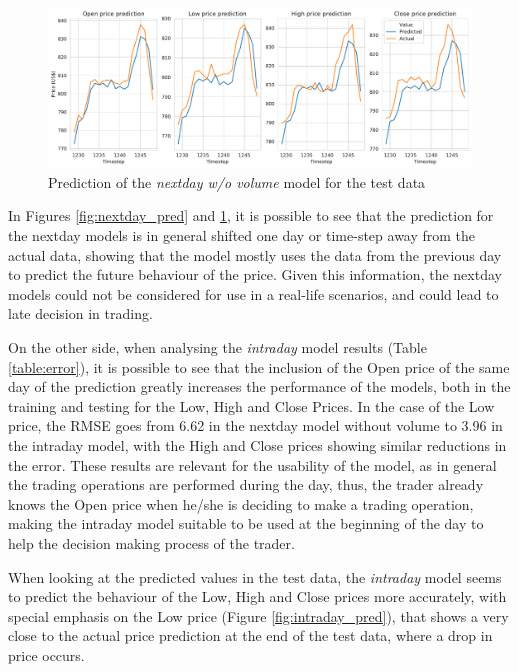 \documentclass[10pt,twocolumn,letterpaper]{article}
\begin{document}
\begin{figure}[h]
	\begin{center}
		\includegraphics[width=1\linewidth]{prediction_nextday_novolume.pdf}
		\caption{Prediction of the \textit{nextday w/o volume} model for the test data}
		\label{fig:nextday_novolume_pred}
	\end{center}
\end{figure}


In Figures \ref{fig:nextday_pred} and \ref{fig:nextday_novolume_pred}, it is possible to see that the prediction for the nextday models is in general shifted one day or time-step away from the actual data, showing that the model mostly uses the data from the previous day to predict the future behaviour of the price. Given this information, the nextday models could not be considered for use in a real-life scenarios, and could lead to late decision in trading.

On the other side, when analysing the \textit{intraday} model results (Table \ref{table:error}), it is possible to see that the inclusion of the Open price of the same day of the prediction greatly increases the performance of the models, both in the training and testing for the Low, High and Close Prices. In the case of the Low price, the RMSE goes from 6.62 in the nextday model without volume to 3.96 in the intraday model, with the High and Close prices showing similar reductions in the error. These results are relevant for the usability of the model, as in general the trading operations are performed during the day, thus, the trader already knows the Open price when he/she is deciding to make a trading operation, making the intraday model suitable to be used at the beginning of the day to help the decision making process of the trader. 

When looking at the predicted values in the test data, the \textit{intraday} model seems to predict the behaviour of the Low, High and Close prices more accurately, with special emphasis on the Low price (Figure \ref{fig:intraday_pred}), that shows a very close to the actual price prediction at the end of the test data, where a drop in price occurs.
\end{document}
